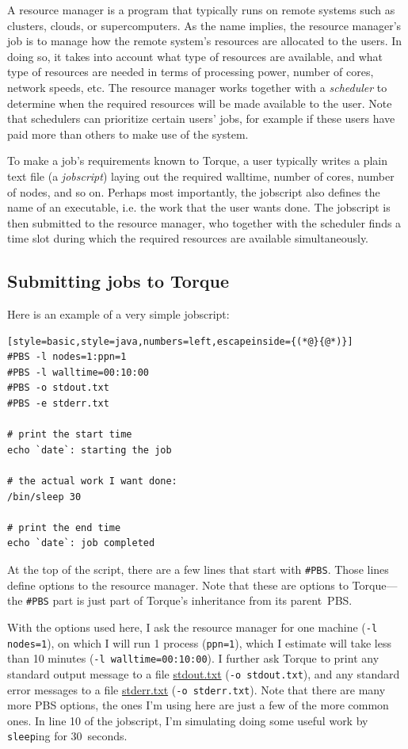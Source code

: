 \documentclass[12pt, a4paper, twoside, openany, titlepage]{book}
\begin{document}
A resource manager is a program that typically runs on remote systems such as clusters, clouds, or supercomputers. As the name implies, the resource manager's job is to manage how the remote system's resources are allocated to the users. In doing so, it takes into account what type of resources are available, and what type of resources are needed in terms of processing power, number of cores, network speeds, etc. The resource manager works together with a \textit{scheduler} to determine when the required resources will be made available to the user. Note that schedulers can prioritize certain users' jobs, for example if these users have paid more than others to make use of the system.

To make a job's requirements known to Torque, a user typically writes a plain text file (a \textit{jobscript}) laying out the required walltime, number of cores, number of nodes, and so on. Perhaps most importantly, the jobscript also defines the name of an executable, i.e. the work that the user wants done. The jobscript is then submitted to the resource manager, who together with the scheduler finds a time slot during which the required resources are available simultaneously.

\clearpage
\subsection{Submitting jobs to Torque}

Here is an example of a very simple jobscript:
\begin{lstlisting}[style=basic,style=java,numbers=left,escapeinside={(*@}{@*)}]
#PBS -l nodes=1:ppn=1
#PBS -l walltime=00:10:00
#PBS -o stdout.txt
#PBS -e stderr.txt

# print the start time
echo `date`: starting the job

# the actual work I want done:
/bin/sleep 30

# print the end time
echo `date`: job completed
\end{lstlisting}


At the top of the script, there are a few lines that start with \texttt{\#PBS}. Those lines define options to the resource manager. Note that these are options to Torque---the \texttt{\#PBS} part is just part of Torque's inheritance from its parent~PBS.

With the options used here, I ask the resource manager for one machine \mbox{(\texttt{-l nodes=1})}, on which I will run 1 process (\texttt{ppn=1}), which I estimate will take less than 10 minutes (\texttt{-l walltime=00:10:00}). I further ask Torque to print any standard output message to a file \url{stdout.txt} (\texttt{-o stdout.txt}), and any standard error messages to a file \url{stderr.txt} (\texttt{-o stderr.txt}). Note that there are many more PBS options, the ones I'm using here are just a few of the more common ones. In line 10 of the jobscript, I'm simulating doing some useful work by \texttt{sleep}ing for 30~seconds.
\end{document}

